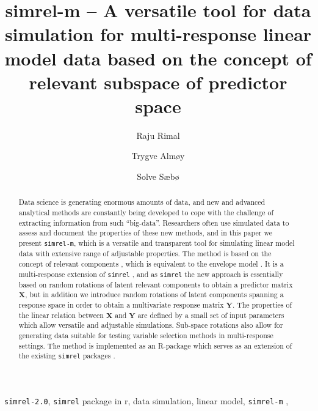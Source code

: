 \documentclass[12pt,a4paperpaper,authoryear]{elsarticle} %
\begin{document}
\begin{frontmatter}

  \title{simrel-m -- A versatile tool for data simulation for multi-response
linear model data based on the concept of relevant subspace of predictor
space}
    \author[Norwegian University of Life Sciences]{Raju Rimal}
  
  
    \author[Norwegian University of Life Sciences]{Trygve Almøy}
  
  
    \author[Norwegian University of Life Sciences]{Solve Sæbø}
  
    
  \begin{abstract}
  \small
  Data science is generating enormous amounts of data, and new and
  advanced analytical methods are constantly being developed to cope with
  the challenge of extracting information from such ``big-data''.
  Researchers often use simulated data to assess and document the
  properties of these new methods, and in this paper we present
  \texttt{simrel-m}, which is a versatile and transparent tool for
  simulating linear model data with extensive range of adjustable
  properties. The method is based on the concept of relevant components
  \citet{helland1994comparison}, which is equivalent to the envelope model
  \citet{cook2013envelopes}. It is a multi-response extension of
  \texttt{simrel} \citet{saebo2015simrel}, and as \texttt{simrel} the new
  approach is essentially based on random rotations of latent relevant
  components to obtain a predictor matrix \(\mathbf{X}\), but in addition
  we introduce random rotations of latent components spanning a response
  space in order to obtain a multivariate response matrix \(\mathbf{Y}\).
  The properties of the linear relation between \(\mathbf{X}\) and
  \(\mathbf{Y}\) are defined by a small set of input parameters which
  allow versatile and adjustable simulations. Sub-space rotations also
  allow for generating data suitable for testing variable selection
  methods in multi-response settings. The method is implemented as an
  R-package which serves as an extension of the existing \texttt{simrel}
  packages \citet{saebo2015simrel}.
  \end{abstract}
   \begin{keyword} \footnotesize \texttt{simrel-2.0}, \texttt{simrel} package in r, data
simulation, linear model, \texttt{simrel-m} \sep \end{keyword}
 \end{frontmatter}
\end{document}
